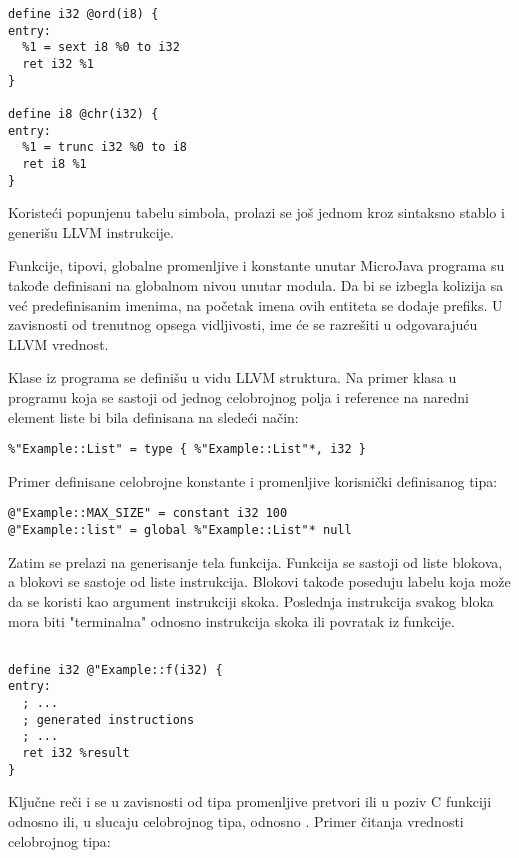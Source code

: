 \begin{lstlisting}
define i32 @ord(i8) {
entry:
  %1 = sext i8 %0 to i32
  ret i32 %1
}

define i8 @chr(i32) {
entry:
  %1 = trunc i32 %0 to i8
  ret i8 %1
}
\end{lstlisting}

Koristeći popunjenu tabelu simbola, prolazi se još jednom kroz sintaksno stablo i generišu LLVM instrukcije.

Funkcije, tipovi, globalne promenljive i konstante unutar MicroJava programa su takođe definisani na globalnom nivou unutar modula.
Da bi se izbegla kolizija sa već predefinisanim imenima, na početak imena ovih entiteta se dodaje prefiks.
U zavisnosti od trenutnog opsega vidljivosti, ime će se razrešiti u odgovarajuću LLVM vrednost.

Klase iz programa se definišu u vidu LLVM struktura.
Na primer klasa  u programu  koja se sastoji od jednog celobrojnog polja i reference na naredni element liste bi bila definisana na sledeći način:

\begin{lstlisting}
%"Example::List" = type { %"Example::List"*, i32 }
\end{lstlisting}

Primer definisane celobrojne konstante i promenljive korisnički definisanog tipa:

\begin{lstlisting}
@"Example::MAX_SIZE" = constant i32 100
@"Example::list" = global %"Example::List"* null
\end{lstlisting}

Zatim se prelazi na generisanje tela funkcija.
Funkcija se sastoji od liste blokova, a blokovi se sastoje od liste instrukcija.
Blokovi takođe poseduju labelu koja može da se koristi kao argument instrukciji skoka.
Poslednja instrukcija svakog bloka mora biti "terminalna" odnosno instrukcija skoka ili povratak iz funkcije.

\begin{lstlisting}

define i32 @"Example::f(i32) {
entry:
  ; ...
  ; generated instructions
  ; ...
  ret i32 %result
}
\end{lstlisting}

Ključne reči  i  se u zavisnosti od tipa promenljive pretvori ili u poziv C funkciji  odnosno  ili, u slucaju celobrojnog tipa,  odnosno .
Primer čitanja vrednosti celobrojnog tipa:

